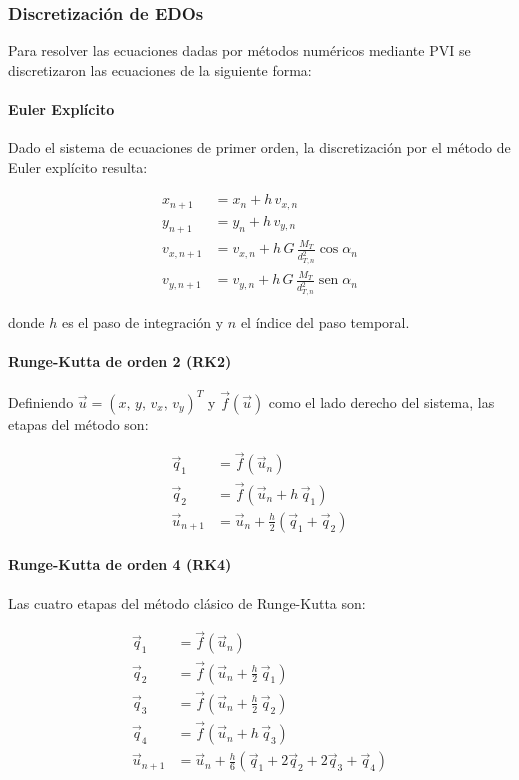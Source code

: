 \subsubsection{Discretización de EDOs}
Para resolver las ecuaciones dadas por métodos numéricos mediante PVI se discretizaron las ecuaciones de la siguiente forma:

\paragraph{Euler Explícito}
Dado el sistema de ecuaciones de primer orden, la discretización por el método de Euler explícito resulta:

\begin{align}
    x_{n+1}      &= x_n + h\, v_{x,n} \\[4pt]
    y_{n+1}      &= y_n + h\, v_{y,n} \\[4pt]
    v_{x,n+1}    &= v_{x,n} + h\, G\,\frac{M_T}{d_{T,n}^2}\cos\alpha_n \\[4pt]
    v_{y,n+1}    &= v_{y,n} + h\, G\,\frac{M_T}{d_{T,n}^2}\operatorname{sen}\alpha_n
\end{align}

donde $h$ es el paso de integración y $n$ el índice del paso temporal.

\paragraph{Runge-Kutta de orden 2 (RK2)}
Definiendo $\vec{u} = (x,\, y,\, v_x,\, v_y)^T$ y $\vec{f}(\vec{u})$ como el lado derecho del sistema, las etapas del método son:

\begin{align}
    \vec{q}_1 &= \vec{f}\!\left(\vec{u}_n\right) \\[4pt]
    \vec{q}_2 &= \vec{f}\!\left(\vec{u}_n + h\,\vec{q}_1\right) \\[6pt]
    \vec{u}_{n+1} &= \vec{u}_n + \frac{h}{2}\left(\vec{q}_1 + \vec{q}_2\right)
\end{align}

\paragraph{Runge-Kutta de orden 4 (RK4)}
Las cuatro etapas del método clásico de Runge-Kutta son:

\begin{align}
    \vec{q}_1 &= \vec{f}\!\left(\vec{u}_n\right) \\[4pt]
    \vec{q}_2 &= \vec{f}\!\left(\vec{u}_n + \frac{h}{2}\,\vec{q}_1\right) \\[4pt]
    \vec{q}_3 &= \vec{f}\!\left(\vec{u}_n + \frac{h}{2}\,\vec{q}_2\right) \\[4pt]
    \vec{q}_4 &= \vec{f}\!\left(\vec{u}_n + h\,\vec{q}_3\right) \\[6pt]
    \vec{u}_{n+1} &= \vec{u}_n + \frac{h}{6}\left(\vec{q}_1 + 2\vec{q}_2 + 2\vec{q}_3 + \vec{q}_4\right)
\end{align}

